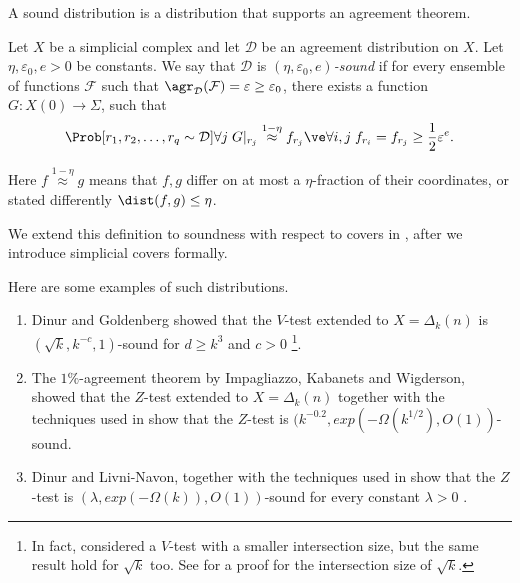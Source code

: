 %
A sound distribution is a distribution that supports an agreement theorem.
\begin{definition} \label{def:distribution-soundness}
    Let \(X\) be a simplicial complex and let \(\mathcal{D}\) be an agreement distribution on \(X\). Let \(\eta,\varepsilon_0,e > 0\) be constants. We say that \(\mathcal{D}\) is \emph{\((\eta,\varepsilon_0,e)\)-sound} if for every ensemble of functions \(\mathcal{F}\) such that \(\agr_{\mathcal{D}}(\mathcal{F}) = \varepsilon \geq \varepsilon_0\), there exists a function \(G:X(0)\to \Sigma\), such that
    \begin{equation} \label{eq:dist-soundness}
        \Prob[r_1,r_2,\dots,r_q \sim \mathcal{D}]{\forall j \; G|_{r_j} \overset{1-\eta}{\approx} f_{r_j} \ve \forall i,j \; f_{r_i} = f_{r_j}} \geq \frac{1}{2}\varepsilon^e.    
    \end{equation}
    
\end{definition}
Here \(f \overset{1-\eta}{\approx} g\) means that \(f,g\) differ on at most a \(\eta\)-fraction of their coordinates, or stated differently \(\dist(f,g) \leq \eta\).

We extend this definition to soundness with respect to covers in , after we introduce simplicial covers formally.

Here are some examples of such distributions.
\begin{example} \label{ex:sound-distributions}
    \begin{enumerate}
    \item Dinur and Goldenberg showed that the \(V\)-test extended to \(X=\Delta_k(n)\) is \((\sqrt{k},k^{-c},1)\)-sound for \(d \geq k^3\)  and \(c > 0\) \cite{DinurG2008}\footnote{In fact, \cite{DinurG2008} considered a \(V\)-test with a smaller intersection size, but the same result hold for \(\sqrt{k}\) too. See \cite{ImpagliazzoKW2012} for a proof for the intersection size of \(\sqrt{k}\).}.
    \item The \(1\%\)-agreement theorem by Impagliazzo, Kabanets and Wigderson, showed that the \(Z\)-test extended to \(X=\Delta_k(n)\) together with the techniques used in \cite[Theorem 5.1]{DinurG2008} show that the \(Z\)-test is \((k^{-0.2},exp(-\Omega(k^{1/2}),O(1))\)-sound.
    \item Dinur and Livni-Navon, together with the techniques used in \cite[Theorem 5.1]{DinurG2008} show that the \(Z\)-test is \((\lambda,exp(-\Omega(k)),O(1))\)-sound for every constant \(\lambda > 0\) \cite{DinurL2017}.
\end{enumerate}
\end{example}

